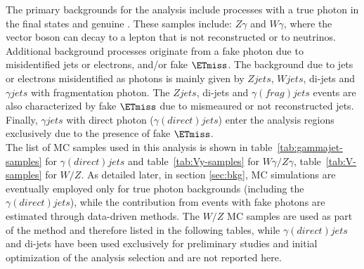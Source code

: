 The primary backgrounds for the analysis include processes with a true photon in the final states and genuine \ETmiss. These samples include: $Z\gamma$ and $W\gamma$, where the vector boson can decay to a lepton that is not reconstructed or to neutrinos.
Additional background processes originate from a fake photon due to misidentified jets or electrons, and/or fake $\ETmiss$. 
The background due to jets or electrons misidentified as photons is mainly given by $Zjets$, $Wjets$, di-jets and $\gamma jets$ with fragmentation photon. The $Zjets$, di-jets and $\gamma(frag) jets$ events are also characterized by fake $\ETmiss$ due to mismeaured or not reconstructed jets. Finally, $\gamma jets$ with direct photon ($\gamma (direct)jets$) enter the analysis regions exclusively due to the presence of fake $\ETmiss$. \\
The list of MC samples used in this analysis is shown in table~\ref{tab:gammajet-samples} for $\gamma(direct) jets$ and table~\ref{tab:Vy-samples} for $W\gamma/Z\gamma$, table~\ref{tab:V-samples} for $W/Z$. As detailed later, in section \ref{sec:bkg}, MC simulations are eventually employed only for true photon backgrounds (including the $\gamma(direct) jets$), while the contribution from events with fake photons are estimated through data-driven methods. The $W/Z$ MC samples are used as part of the \jfakey method and therefore listed in the following tables, while $\gamma(direct) jets$ and di-jets have been used exclusively for preliminary studies and initial optimization of the analysis selection and are not reported here.  

